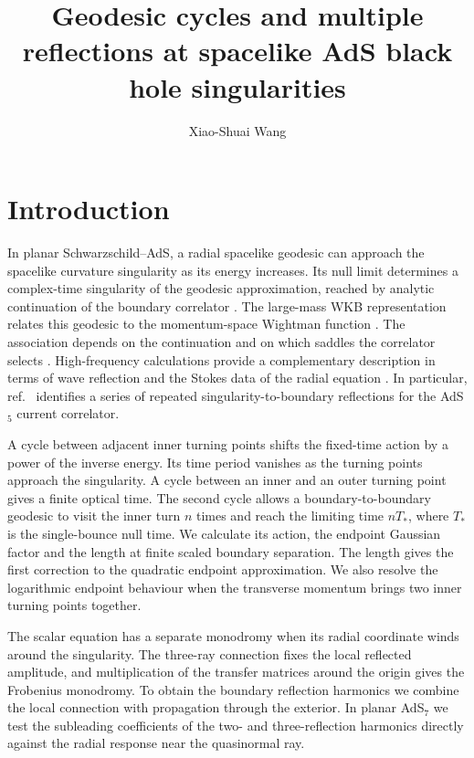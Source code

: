 \documentclass[11pt,a4paper]{article}
\title{Geodesic cycles and multiple reflections at spacelike AdS black hole singularities}
\author{Xiao-Shuai Wang}
\affiliation{Kavli Institute for Theoretical Sciences and School of Quantum,\\
University of Chinese Academy of Sciences, Beijing 100190, China}
\begin{document}
\maketitle
\flushbottom

\section{Introduction}

In planar Schwarzschild--AdS, a radial spacelike geodesic can approach the spacelike curvature singularity as its energy increases. Its null limit determines a complex-time singularity of the geodesic approximation, reached by analytic continuation of the boundary correlator \cite{Fidkowski:2003}. The large-mass WKB representation relates this geodesic to the momentum-space Wightman function \cite{Festuccia:2005}. The association depends on the continuation and on which saddles the correlator selects \cite{AliAhmad:2026,Grozdanov:2026}. High-frequency calculations provide a complementary description in terms of wave reflection and the Stokes data of the radial equation \cite{AfkhamiJeddi:2025,JiaSpectral:2026,Jia:2026,Valach:2026}. In particular, ref.~\cite{AfkhamiJeddi:2025} identifies a series of repeated singularity-to-boundary reflections for the AdS\(_5\) current correlator.

A cycle between adjacent inner turning points shifts the fixed-time action by a power of the inverse energy. Its time period vanishes as the turning points approach the singularity. A cycle between an inner and an outer turning point gives a finite optical time. The second cycle allows a boundary-to-boundary geodesic to visit the inner turn \(n\) times and reach the limiting time \(nT_*\), where \(T_*\) is the single-bounce null time. We calculate its action, the endpoint Gaussian factor and the length at finite scaled boundary separation. The length gives the first correction to the quadratic endpoint approximation. We also resolve the logarithmic endpoint behaviour when the transverse momentum brings two inner turning points together.

The scalar equation has a separate monodromy when its radial coordinate winds around the singularity. The three-ray connection fixes the local reflected amplitude, and multiplication of the transfer matrices around the origin gives the Frobenius monodromy. To obtain the boundary reflection harmonics we combine the local connection with propagation through the exterior. In planar AdS\(_7\) we test the subleading coefficients of the two- and three-reflection harmonics directly against the radial response near the quasinormal ray.
\end{document}
